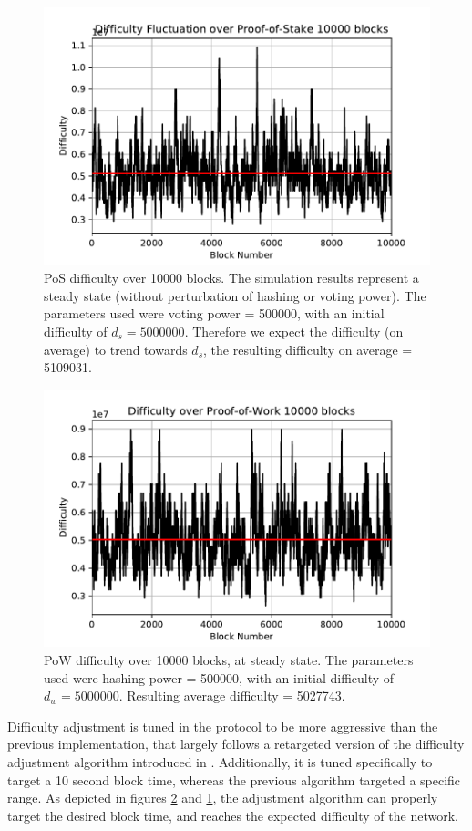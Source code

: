 \begin{figure}
    \centering
    \includegraphics[width=0.55\linewidth]{assets/sim_results/pos_10000_difficulty.pdf}
    \caption{PoS difficulty over 10000 blocks. The simulation results represent
    a steady state (without perturbation of hashing or voting power). The parameters used
    were voting power = 500000, with an initial difficulty of $d_s=5000000$. Therefore we
    expect the difficulty (on average) to trend towards $d_s$, the resulting difficulty on
    average = 5109031.}
    \label{fig:pos_block_difficulty}
\end{figure}

\begin{figure}
    \centering
    \includegraphics[width=0.55\linewidth]{assets/sim_results/pow_10000_difficulty.pdf}
    \caption{PoW difficulty over 10000 blocks, at steady state. The parameters used
    were hashing power = 500000, with an initial difficulty of $d_w=5000000$. Resulting average
    difficulty = 5027743.}
    \label{fig:pow_block_difficulty}
\end{figure}

Difficulty adjustment is tuned in the protocol to be more aggressive than the previous implementation,
that largely follows a retargeted version of the difficulty adjustment algorithm
introduced in \cite{wood2014ethereum}. Additionally, it is tuned specifically to target a
10 second block time, whereas the previous algorithm targeted a specific range. As depicted
in figures \ref{fig:pow_block_difficulty} and \ref{fig:pos_block_difficulty}, the 
adjustment algorithm can properly target the desired block time, and reaches
the expected difficulty of the network.